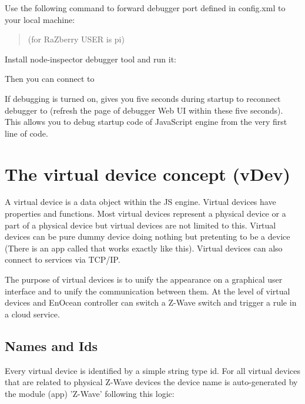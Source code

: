 Use the following command to forward debugger port defined in config.xml to your local machine:
\begin{quote} 
(for RaZberry USER is pi)
\end{quote} 


Install node-inspector debugger tool and run it:
\begin{quote} 
\end{quote} 

Then you can connect to 


If debugging is turned on, \zway gives you five seconds during startup to reconnect debugger to 
\zway (refresh the page of debugger Web UI within these five seconds).
This allows you to debug startup code of \zway JavaScript engine from the very first line of code.

\section{The virtual device concept (vDev)}
\label{cap:vdev}

A virtual device is a data object within the JS engine. Virtual devices have 
properties and functions. Most virtual devices represent a physical device or a part of 
a physical device but virtual devices are not limited to this. Virtual devices can be 
pure dummy device doing nothing but pretenting to be a device (There is an app called
 that works exactly like this). Virtual devices can also connect to
services via TCP/IP.

The purpose of virtual devices is to unify the appearance on a graphical user interface 
and to unify the communication between them. At the level of virtual devices 
and EnOcean controller can switch a Z-Wave switch and trigger a rule in a cloud 
service.
 
\subsection{Names and Ids}

Every virtual device is identified by a simple string type id. For all virtual devices 
that are related to physical Z-Wave devices the device name is auto-generated by the 
module (app) 'Z-Wave' following this logic:

